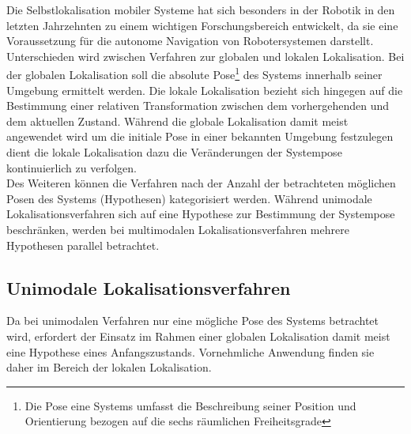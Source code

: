 Die Selbstlokalisation mobiler Systeme hat sich besonders in der Robotik in den letzten Jahrzehnten zu einem wichtigen Forschungsbereich entwickelt, da sie eine Voraussetzung für die autonome Navigation von Robotersystemen darstellt. \\
Unterschieden wird zwischen Verfahren zur globalen und lokalen Lokalisation. Bei der globalen Lokalisation soll die absolute Pose\footnote{Die Pose eine Systems umfasst die Beschreibung seiner Position und Orientierung bezogen auf die sechs räumlichen Freiheitsgrade } des Systems innerhalb seiner Umgebung ermittelt werden. Die lokale Lokalisation bezieht sich hingegen auf die Bestimmung einer relativen Transformation zwischen dem vorhergehenden und dem aktuellen Zustand. Während die globale Lokalisation damit meist angewendet wird um die initiale Pose in einer bekannten Umgebung festzulegen dient die lokale Lokalisation dazu die Veränderungen der Systempose kontinuierlich zu verfolgen. \\

Des Weiteren können die Verfahren nach der Anzahl der betrachteten möglichen Posen des Systems (Hypothesen) kategorisiert werden. Während unimodale Lokalisationsverfahren sich auf eine Hypothese zur Bestimmung der Systempose beschränken, werden bei multimodalen Lokalisationsverfahren mehrere Hypothesen parallel betrachtet.
\subsection{Unimodale Lokalisationsverfahren}
\label{chap.unimod}
Da bei unimodalen Verfahren nur eine mögliche Pose des Systems betrachtet wird, erfordert der Einsatz im Rahmen einer globalen Lokalisation damit meist eine  \red[(plausible)] Hypothese eines Anfangszustands. Vornehmliche Anwendung finden sie daher im Bereich der lokalen Lokalisation. 

